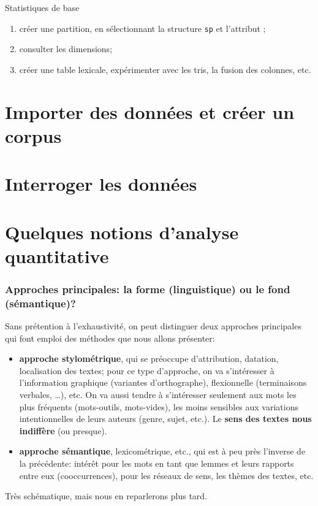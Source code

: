 \documentclass{beamer}
\begin{document}
\begin{frame}{Statistiques de base}
\begin{enumerate}
\item créer une partition, en sélectionnant la structure \texttt{sp} et l'attribut \texttt{\@who};
\item consulter les dimensions;
\item créer une table lexicale, expérimenter avec les tris, la fusion des colonnes, etc.
\end{enumerate}
\end{frame}



\section{Importer des données et créer un corpus}

\section{Interroger les données}

\section{Quelques notions d'analyse quantitative}


\begin{frame}[fragile]
\frametitle{Approches principales: la forme (linguistique) ou le fond (sémantique)?}

Sans prétention à l'exhaustivité, on peut distinguer deux approches principales qui font emploi des méthodes que nous allons présenter:
\begin{itemize}
	\item \textbf{approche stylométrique}, qui se préoccupe d'attribution, datation, localisation des textes; pour ce type d'approche, on va s'intéresser à l'information graphique (variantes d'orthographe), flexionnelle (terminaisons verbales, …), etc. On va aussi tendre à s'intéresser seulement aux \alert{mots les plus fréquents} (mots-outils, mots-vides), les moins sensibles aux variations intentionnelles de leurs auteurs (genre, sujet, etc.). Le \textbf{sens des textes nous indiffère} (ou presque).
	\item \textbf{approche sémantique}, lexicométrique, etc., qui est à peu près l'inverse de la précédente: intérêt pour les mots en tant que lemmes et leurs rapports entre eux (cooccurrences), pour les réseaux de sens, les thèmes des textes, etc.
\end{itemize}
Très schématique, mais nous en reparlerons plus tard.
\end{frame}
\end{document}
